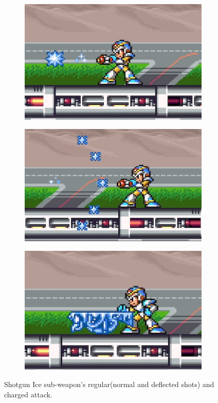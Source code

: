 \begin{figure}[htp]
	\centering
	\begin{subfigure}{0.3\linewidth}
		\includegraphics[width=\linewidth]{figures/X1/weapons/Shotgun_ice_1.jpg}
	\end{subfigure}
	\begin{subfigure}{0.31\linewidth}
	\includegraphics[width=\linewidth]{figures/X1/weapons/Shotgun_ice_2.jpg}
	\end{subfigure}
	\begin{subfigure}{0.29\linewidth}
		\includegraphics[width=\linewidth]{figures/X1/weapons/Shotgun_ice_3.jpg}
	\end{subfigure}
	\caption{Shotgun Ice sub-weapon's regular(normal and deflected shots) and charged attack.}
\end{figure}


